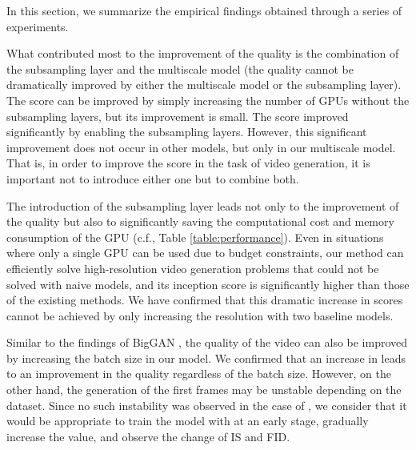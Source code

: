 \documentclass[twocolumn]{svjour3}
\def\Table#1{Table \ref{table:#1}}
\begin{document}
In this section, we summarize the empirical findings obtained through a series of experiments.










What contributed most to the improvement of the quality
is the combination of the subsampling layer and the multiscale model
(the quality cannot be dramatically improved by either the multiscale model or the subsampling layer).
The score can be improved by simply increasing the number of GPUs without the subsampling layers,
but its improvement is small.
The score improved significantly by enabling the subsampling layers.
However, this significant improvement does not occur in other models,
but only in our multiscale model.
That is, in order to improve the score in the task of video generation,
it is important not to introduce either one but to combine both.









The introduction of the subsampling layer leads not only to the improvement of the quality
but also to significantly saving the computational cost and memory consumption of the GPU
(c.f., \Table{performance}).
Even in situations where only a single GPU can be used due to budget constraints,
our method can efficiently solve high-resolution video generation problems
that could not be solved with naive models,
and its inception score is significantly higher than those of the existing methods.
We have confirmed that this dramatic increase in scores
cannot be achieved by only increasing the resolution with two baseline models.








Similar to the findings of BigGAN \cite{Brock2018}, the quality of the video can also be improved by increasing the batch size in our model.
We confirmed that an increase in  leads to an improvement in the quality regardless of the batch size.
However, on the other hand, the generation of the first frames may be unstable depending on the dataset.
Since no such instability was observed in the case of ,
we consider that it would be appropriate to train the model with  at an early stage,
gradually increase the value, and observe the change of IS and FID.
\end{document}
